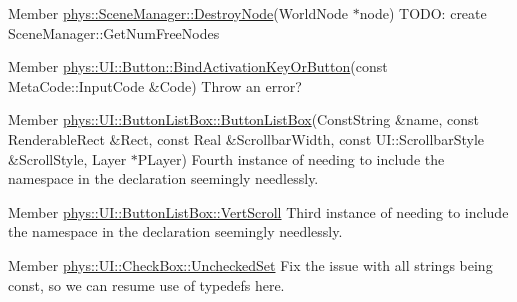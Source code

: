 \label{todo__todo000024}
\hypertarget{todo__todo000024}{}
 
\begin{DoxyDescription}
\item[Member \hyperlink{classphys_1_1SceneManager_a5a2d68ab38308f9c6ac4b659cae36dee}{phys::SceneManager::DestroyNode}(WorldNode $\ast$node) ]TODO: create SceneManager::GetNumFreeNodes 
\end{DoxyDescription}

\label{todo__todo000025}
\hypertarget{todo__todo000025}{}
 
\begin{DoxyDescription}
\item[Member \hyperlink{classphys_1_1UI_1_1Button_a3b51fa981fdf869240bff082bafb56a9}{phys::UI::Button::BindActivationKeyOrButton}(const MetaCode::InputCode \&Code) ]Throw an error? 
\end{DoxyDescription}

\label{todo__todo000026}
\hypertarget{todo__todo000026}{}
 
\begin{DoxyDescription}
\item[Member \hyperlink{classphys_1_1UI_1_1ButtonListBox_a43ac98232280969a8ce2641d36658808}{phys::UI::ButtonListBox::ButtonListBox}(ConstString \&name, const RenderableRect \&Rect, const Real \&ScrollbarWidth, const UI::ScrollbarStyle \&ScrollStyle, Layer $\ast$PLayer) ]Fourth instance of needing to include the namespace in the declaration seemingly needlessly. 
\end{DoxyDescription}

\label{todo__todo000027}
\hypertarget{todo__todo000027}{}
 
\begin{DoxyDescription}
\item[Member \hyperlink{classphys_1_1UI_1_1ButtonListBox_aa47d94d75c58e3408a97766eace2c20e}{phys::UI::ButtonListBox::VertScroll} ]Third instance of needing to include the namespace in the declaration seemingly needlessly. 
\end{DoxyDescription}

\label{todo__todo000028}
\hypertarget{todo__todo000028}{}
 
\begin{DoxyDescription}
\item[Member \hyperlink{classphys_1_1UI_1_1CheckBox_a7b670d93f119193283ec78b94f842429}{phys::UI::CheckBox::UncheckedSet} ]Fix the issue with all strings being const, so we can resume use of typedefs here. 
\end{DoxyDescription}


